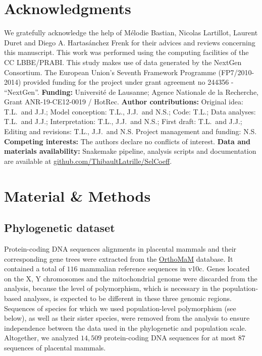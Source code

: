 \documentclass{article}
\begin{document}
    \section*{Acknowledgments}
    \label{sec:acknowledgment}
    We gratefully acknowledge the help of Mélodie Bastian, Nicolas Lartillot, Laurent Duret and Diego A. Hartasánchez Frenk for their advices and reviews concerning this manuscript.
    This work was performed using the computing facilities of the CC LBBE/PRABI\@.
    This study makes use of data generated by the NextGen Consortium.
    The European Union’s Seventh Framework Programme (FP7/2010-2014) provided funding for the project under grant agreement no 244356 - “NextGen”.
    \textbf{Funding:}
    Université de Lausanne; Agence Nationale de la Recherche, Grant ANR-19-CE12-0019 / HotRec.
    \textbf{Author contributions:}
    Original idea: T.L.\ and J.J.;
    Model conception: T.L., J.J.\ and N.S.;
    Code: T.L.;
    Data analyses: T.L.\ and J.J.;
    Interpretation: T.L., J.J.\ and N.S.;
    First draft: T.L.\ and J.J.;
    Editing and revisions: T.L., J.J.\ and N.S.
    Project management and funding: N.S\@.
    \textbf{Competing interests:}
    The authors declare no conflicts of interest.
    \textbf{Data and materials availability:}
    Snakemake pipeline, analysis scripts and documentation are available at \href{https://github.com/ThibaultLatrille/SelCoeff}{github.com/ThibaultLatrille/SelCoeff}.


    \section{Material \& Methods}
    \label{sec:methods}

    \subsection{Phylogenetic dataset}

    Protein-coding DNA sequences alignments in placental mammals and their corresponding gene trees were extracted from the \href{https://www.orthomam.univ-montp2.fr}{OrthoMaM} database.
    It contained a total of $116$ mammalian reference sequences in v10c\cite{ranwez_orthomam_2007, douzery_orthomam_2014, scornavacca_orthomam_2019}.
    Genes located on the X, Y chromosomes and the mitochondrial genome were discarded from the analysis, because the level of polymorphism, which is necessary in the population-based analyses, is expected to be different in these three genomic regions.
    Sequences of species for which we used population-level polymorphism (see below), as well as their sister species, were removed from the analysis to ensure independence between the data used in the phylogenetic and population scale.
    Altogether, we analyzed $14,509$ protein-coding DNA sequences for at most $87$ sequences of placental mammals.
\end{document}
